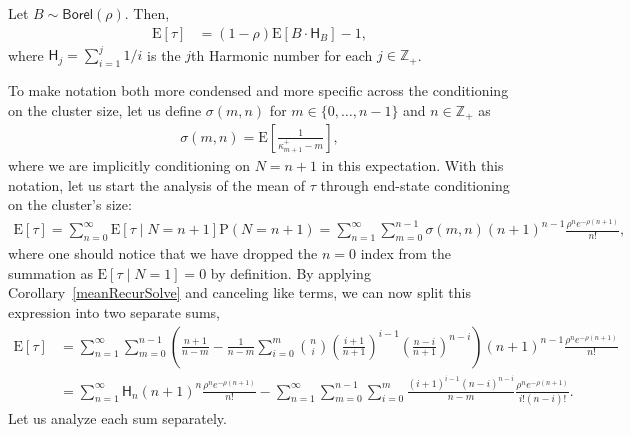 \documentclass[stsy,dblanonrev]{amers/INFORMS-STSY-Template-26-02-2026/informs4}
\newcommand{\E}[1]{{\mathrm{E}\left[#1\right]}}
\newcommand{\PP}[1]{\mathrm{P}\left(#1\right)}
\begin{document}
\begin{theorem}\label{meanIdThm}
Let $B \sim \mathsf{Borel}(\rho)$. Then,
\begin{align}
\E{\tau}
&=
\left(1-\rho\right)
\E{B \cdot \mathsf{H}_B}
-
1
,
\end{align}
where $\mathsf{H}_j = \sum_{i=1}^j 1/i$ is the $j$th Harmonic number for each $j \in \mathbb{Z}_+$.
\end{theorem}
To make notation both more condensed and more specific across the conditioning on the cluster size, let us define $\sigma(m,n)$ for $m \in \{0, \dots, n - 1\}$ and $n \in \mathbb{Z}_+$ as
\begin{align}
\sigma(m,n)
=
\E{\frac{1}{\kappa_{m+1}^+-m}}
,
\end{align}
where we are implicitly conditioning on $N=n+1$ in this expectation. With this notation, let us start the analysis of the mean of $\tau$ through end-state conditioning on the cluster's size:
\begin{align}
\E{\tau}
=
\sum_{n=0}^\infty \E{\tau \mid N = n+1}\PP{N=n+1}
=
\sum_{n=1}^\infty \sum_{m=0}^{n-1} \sigma(m,n)  (n+1)^{n-1} \frac{\rho^n e^{-\rho(n+1)}}{n!} 
,
\end{align}
where one should notice that we have dropped the $n=0$ index from the summation as $\E{\tau \mid N = 1} = 0$ by definition. By applying Corollary~\ref{meanRecurSolve} and canceling like terms, we can now split this expression into two separate sums,
\begin{align}
\E{\tau}
&=
\sum_{n=1}^\infty 
\sum_{m=0}^{n-1}
\left(
\frac{n+1}{n-m}
-
\frac{1}{n-m}
\sum_{i=0}^m
{n \choose i}
\left(\frac{i+1}{n+1}\right)^{i-1}
\left(\frac{n-i}{n+1}\right)^{n-i}
\right)
(n+1)^{n-1} \frac{\rho^n e^{-\rho(n+1)}}{n!}
\\
&=
\sum_{n=1}^\infty 
\mathsf{H}_n (n+1)^{n} \frac{\rho^n e^{-\rho(n+1)}}{n!}
-
\sum_{n=1}^\infty
\sum_{m=0}^{n-1}
\sum_{i=0}^m
\frac{\left({i+1}\right)^{i-1}
\left({n-i}\right)^{n-i}}{n-m}
 \frac{\rho^n e^{-\rho(n+1)}}{i!(n-i)!}
 .
 \label{twoSumEq}
\end{align}
Let us analyze each sum separately. 
\end{document}
